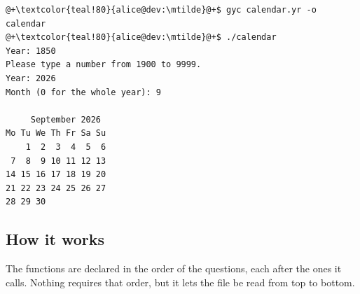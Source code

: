 
\vspace{-10pt}%
\begin{lstlisting}[style=bashVerb, escapechar=@+]
@+\textcolor{teal!80}{alice@dev:\mtilde}@+$ gyc calendar.yr -o calendar
@+\textcolor{teal!80}{alice@dev:\mtilde}@+$ ./calendar
Year: 1850
Please type a number from 1900 to 9999.
Year: 2026
Month (0 for the whole year): 9

     September 2026
Mo Tu We Th Fr Sa Su
    1  2  3  4  5  6
 7  8  9 10 11 12 13
14 15 16 17 18 19 20
21 22 23 24 25 26 27
28 29 30
\end{lstlisting}

\subsection{How it works}

The functions are declared in the order of the questions, each after the ones it
calls. Nothing requires that order, but it lets the file be read from top to
bottom.

